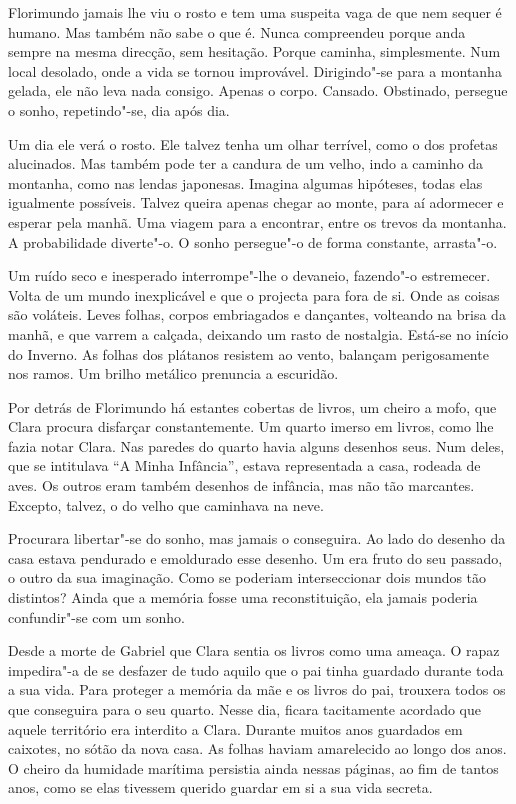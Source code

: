 Florimundo jamais lhe viu o rosto e tem uma suspeita vaga de que nem
sequer é humano. Mas também não sabe o que é. Nunca compreendeu porque
anda sempre na mesma direcção, sem hesitação. Porque caminha,
simplesmente. Num local desolado, onde a vida se tornou improvável.
Dirigindo"-se para a montanha gelada, ele não leva nada consigo. Apenas o
corpo. Cansado. Obstinado, persegue o sonho, repetindo"-se, dia após dia.

Um dia ele verá o rosto. Ele talvez tenha um olhar terrível, como o dos
profetas alucinados. Mas também pode ter a candura de um velho, indo a
caminho da montanha, como nas lendas japonesas. Imagina algumas
hipóteses, todas elas igualmente possíveis. Talvez queira apenas chegar
ao monte, para aí adormecer e esperar pela manhã. Uma viagem para a
encontrar, entre os trevos da montanha. A probabilidade diverte"-o. O
sonho persegue"-o de forma constante, arrasta"-o.

Um ruído seco e inesperado interrompe"-lhe o devaneio, fazendo"-o
estremecer. Volta de um mundo inexplicável e que o projecta para fora de
si. Onde as coisas são voláteis. Leves folhas, corpos embriagados e
dançantes, volteando na brisa da manhã, e que varrem a calçada, deixando
um rasto de nostalgia. Está-se no início do Inverno. As folhas dos
plátanos resistem ao vento, balançam perigosamente nos ramos. Um brilho
metálico prenuncia a escuridão.

Por detrás de Florimundo há estantes cobertas de livros, um cheiro a
mofo, que Clara procura disfarçar constantemente. Um quarto imerso em
livros, como lhe fazia notar Clara. Nas paredes do quarto havia alguns
desenhos seus. Num deles, que se intitulava ``A Minha Infância'', estava
representada a casa, rodeada de aves. Os outros eram também desenhos de
infância, mas não tão marcantes. Excepto, talvez, o do velho que
caminhava na neve.

Procurara libertar"-se do sonho, mas jamais o conseguira. Ao lado do
desenho da casa estava pendurado e emoldurado esse desenho. Um era fruto
do seu passado, o outro da sua imaginação. Como se poderiam
interseccionar dois mundos tão distintos? Ainda que a memória fosse uma
reconstituição, ela jamais poderia confundir"-se com um sonho.

Desde a morte de Gabriel que Clara sentia os livros como uma ameaça. O
rapaz impedira"-a de se desfazer de tudo aquilo que o pai tinha guardado
durante toda a sua vida. Para proteger a memória da mãe e os livros do
pai, trouxera todos os que conseguira para o seu quarto. Nesse dia,
ficara tacitamente acordado que aquele território era interdito a Clara.
Durante muitos anos guardados em caixotes, no sótão da nova casa. As
folhas haviam amarelecido ao longo dos anos. O cheiro da humidade
marítima persistia ainda nessas páginas, ao fim de tantos anos, como se
elas tivessem querido guardar em si a sua vida secreta.

